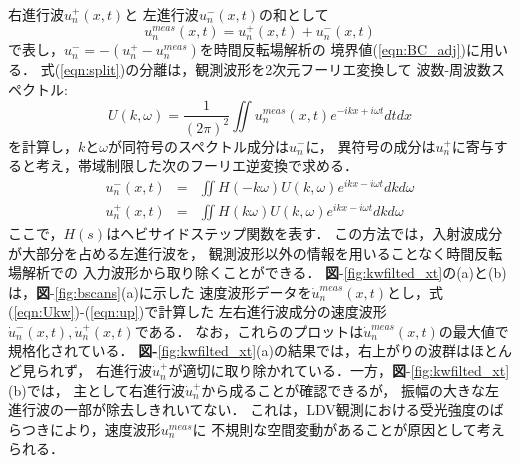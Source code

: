 右進行波$u_n^{+}(x,t)$と
左進行波$u_n^{-}(x,t)$の和として
\begin{equation}
	u_n^{meas}(x,t)=u_n^{+}(x,t)+u_n^{-}(x,t)
	\label{eqn:split}
\end{equation}
で表し，$u_n^-=-(u_n^+-u_n^{meas})$を時間反転場解析の
境界値(\ref{eqn:BC_adj})に用いる．
式(\ref{eqn:split})の分離は，観測波形を2次元フーリエ変換して
波数-周波数スペクトル:
\begin{equation}
	U(k,\omega)= \frac{1}{(2\pi)^2} \iint u^{meas}_n(x,t)e^{-ikx+i\omega t}dtdx
	\label{eqn:Ukw}
\end{equation}
を計算し，$k$と$\omega$が同符号のスペクトル成分は$u_n^-$に，
異符号の成分は$u_n^+$に寄与すると考え，帯域制限した次のフーリエ逆変換で求める．
\begin{eqnarray}
	u_n^-(x,t) &=& \iint H(-k\omega)U(k,\omega)e^{ikx-i\omega t}dk d\omega
	\label{eqn:um} \\
	u_n^+(x,t) &=& \iint H(k\omega) U(k,\omega)e^{ikx-i\omega t}dk d\omega 
	\label{eqn:up}
\end{eqnarray}
ここで，$H(s)$はヘビサイドステップ関数を表す．
この方法では，入射波成分が大部分を占める左進行波を，
観測波形以外の情報を用いることなく時間反転場解析での
入力波形から取り除くことができる．
{\bf 図}-\ref{fig:kwfilted_xt}の(a)と(b)は，{\bf 図}-\ref{fig:bscans}(a)に示した
速度波形データを$\dot u_n^{meas}(x,t)$とし，式(\ref{eqn:Ukw})-(\ref{eqn:up})で計算した
左右進行波成分の速度波形$\dot{u}_n^-(x,t),\dot{u}_n^+(x,t)$である．
なお，これらのプロットは$\dot u_n^{meas}(x,t)$の最大値で規格化されている．
{\bf 図-}\ref{fig:kwfilted_xt}(a)の結果では，右上がりの波群はほとんど見られず，
右進行波$\dot u_n^+$が適切に取り除かれている．一方，{\bf 図}-\ref{fig:kwfilted_xt}(b)では，
主として右進行波$\dot u_n^{+}$から成ることが確認できるが，
振幅の大きな左進行波の一部が除去しきれいてない．
これは，LDV観測における受光強度のばらつきにより，速度波形$u_n^{meas}$に
不規則な空間変動があることが原因として考えられる．

